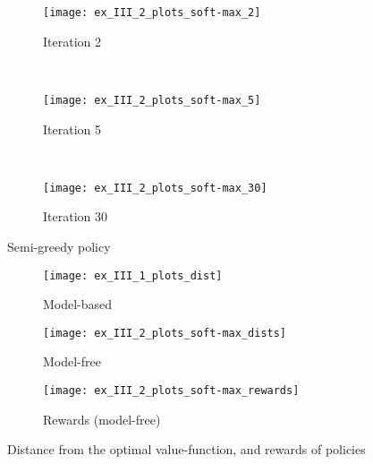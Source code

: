 \begin{multicols}{3}
	\begin{figure}[H]
		\centering
		\begin{subfigure}{\figsize}
			\centering
			\texttt{[image: ex\_III\_2\_plots\_soft-max\_2]}
			\caption{Iteration 2}
			\label{fig:ex_III_2_plots_soft-max_2}
		\end{subfigure}\\
		\begin{subfigure}{\figsize}
			\centering
			\texttt{[image: ex\_III\_2\_plots\_soft-max\_5]}
			\caption{Iteration 5}
			\label{fig:ex_III_2_plots_soft-max_5}
		\end{subfigure}\\
		\begin{subfigure}{\figsize}
			\centering
			\texttt{[image: ex\_III\_2\_plots\_soft-max\_30]}
			\caption{Iteration 30}
			\label{fig:ex_III_2_plots_soft-max_30}
		\end{subfigure}
		\caption{Semi-greedy policy}
		\label{fig:semi-greedy}
	\end{figure}
\end{multicols}

\begin{figure}[H]
	\centering
	\begin{subfigure}{.32\textwidth}
		\centering
		\texttt{[image: ex\_III\_1\_plots\_dist]}
		\caption{Model-based}
		\label{fig:dist-1}
	\end{subfigure}
	\begin{subfigure}{.32\textwidth}
		\centering
		\texttt{[image: ex\_III\_2\_plots\_soft-max\_dists]}
		\caption{Model-free}
		\label{fig:dist-2}
	\end{subfigure}
	\begin{subfigure}{.32\textwidth}
		\centering
		\texttt{[image: ex\_III\_2\_plots\_soft-max\_rewards]}
		\caption{Rewards (model-free)}
		\label{fig:rewards}
	\end{subfigure}
	\caption{Distance from the optimal value-function, and rewards of policies}
\end{figure}


